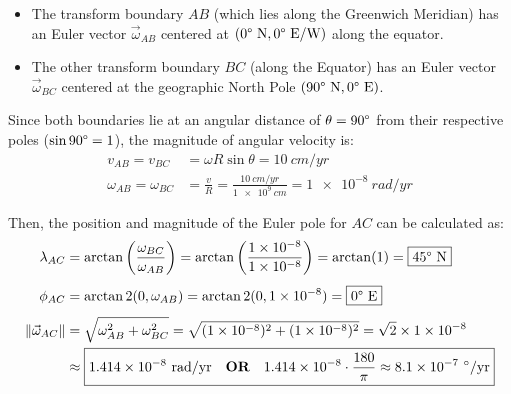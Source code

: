 \documentclass{template}
\begin{document}
\begin{enumerate}[label=\textbf{\arabic*.}]
\begin{enumerate}[label=\Alph*)]
{            \begin{itemize}
                \item The transform boundary $AB$ (which lies along the Greenwich Meridian) has an Euler vector $\vec{\omega}_{AB}$ centered at $(0\degree\text{ N}, 0\degree\text{ E/W})$ along the equator.
                \item The other transform boundary $BC$ (along the Equator) has an Euler vector $\vec{\omega}_{BC}$ centered at the geographic North Pole $(90\degree\text{ N}, 0\degree\text{ E})$.
            \end{itemize}

            Since both boundaries lie at an angular distance of $\theta = 90\degree$ from their respective poles ($\sin 90\degree = 1$), the magnitude of angular velocity is:
            \setlength{\jot}{8pt}
            \begin{align*}
                v_{AB} = v_{BC} &= \omega R \sin\theta = 10 ~\unit{cm/yr} \\[4pt]
                \omega_{AB} = \omega_{BC} &= \frac{v}{R} = \frac{10 ~\unit{cm/yr}}{\num{1e9} ~\unit{cm}} = \num{1e-8} ~\unit{rad/yr}
            \end{align*}


            Then, the position and magnitude of the Euler pole for $AC$ can be calculated as:
            \begin{align*}
                \lambda_{AC} &= \arctan\left(\frac{\omega_{BC}}{\omega_{AB}}\right) = \arctan\left(\frac{\num{1e-8}}{\num{1e-8}}\right) = \arctan(1) = \boxed{45\degree\text{ N}} \\[4pt]
                \phi_{AC} &= \arctan2(0, \omega_{AB}) = \arctan2(0, \num{1e-8}) = \boxed{0\degree\text{ E}} \\[4pt]
                \|\vec{\omega}_{AC}\| &= \sqrt{\omega_{AB}^2 + \omega_{BC}^2} = \sqrt{(\num{1e-8})^2 + (\num{1e-8})^2} = \sqrt{2} \times \num{1e-8}\\ &\approx \boxed{1.414 \times 10^{-8}~\unit{rad/yr}\quad\text{\bf OR}\quad 1.414 \times 10^{-8}\cdot \frac{180}{\pi} \approx 8.1\times 10^{-7}~\unit{\degree/yr}}
            \end{align*}
        }


\end{enumerate}
\end{enumerate}
\end{document}
